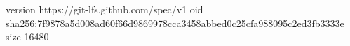 version https://git-lfs.github.com/spec/v1
oid sha256:7f9878a5d008ad60f66d9869978cca3458abbed0c25cfa988095c2ed3fb3333e
size 16480
